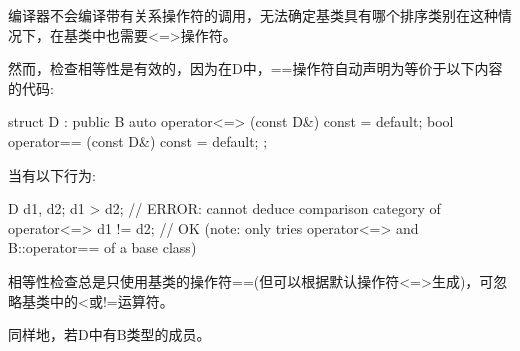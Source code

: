 编译器不会编译带有关系操作符的调用，无法确定基类具有哪个排序类别在这种情况下，在基类中也需要<=>操作符。

然而，检查相等性是有效的，因为在D中，==操作符自动声明为等价于以下内容的代码:

\begin{cpp}
struct D : public B {
	auto operator<=> (const D&) const = default;
	bool operator== (const D&) const = default;
};
\end{cpp}

当有以下行为:

\begin{cpp}
D d1, d2;
d1 > d2; // ERROR: cannot deduce comparison category of operator<=>
d1 != d2; // OK (note: only tries operator<=> and B::operator== of a base class)
\end{cpp}

相等性检查总是只使用基类的操作符==(但可以根据默认操作符<=>生成)，可忽略基类中的<或!=运算符。

同样地，若D中有B类型的成员。
